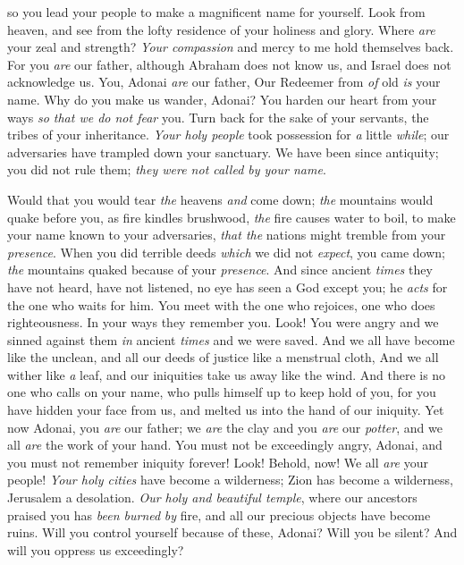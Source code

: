 \begin{biblechapter}
so you lead your people to make a magnificent name for yourself.
 Look from heaven, 
and see from the lofty residence of your holiness and glory. 
Where \textit{are} your zeal and strength? 
\textit{Your compassion} and mercy to me hold themselves back.
\verse For you \textit{are} our father, although Abraham does not know us, 
and Israel does not acknowledge us. 
You, Adonai \textit{are} our father, 
Our Redeemer from \textit{of} old \textit{is} your name.
\verse Why do you make us wander, Adonai? 
You harden our heart from your ways \textit{so that we do not fear} you. 
Turn back for the sake of your servants, 
the tribes of your inheritance.
\verse \textit{Your holy people} took possession for \textit{a} little \textit{while}; 
our adversaries have trampled down your sanctuary.
\verse We have been since antiquity; you did not rule them; 
\textit{they were not called by your name}.
\end{biblechapter}

\begin{biblechapter} %
\verse  Would that you would tear \textit{the} heavens \textit{and} come down; 
\textit{the} mountains would quake before you,
\verse  as fire kindles brushwood, 
\textit{the} fire causes water to boil, 
to make your name known to your adversaries, 
\textit{that the} nations might tremble from your \textit{presence}.
\verse When you did terrible deeds \textit{which} we did not \textit{expect}, you came down; 
\textit{the} mountains quaked because of your \textit{presence}.
\verse And since ancient \textit{times} they have not heard, 
have not listened, 
no eye has seen a God except you; 
he \textit{acts} for the one who waits for him.
\verse You meet with the one who rejoices, 
one who does righteousness. 
In your ways they remember you. 
Look! You were angry and we sinned against them \textit{in} ancient \textit{times} and we were saved.
\verse And we all have become like the unclean, 
and all our deeds of justice like a menstrual cloth, 
And we all wither like \textit{a} leaf, 
and our iniquities take us away like the wind.
\verse And there is no one who calls on your name, 
who pulls himself up to keep hold of you, 
for you have hidden your face from us, 
and melted us into the hand of our iniquity.
\verse Yet now Adonai, you \textit{are} our father; 
we \textit{are} the clay and you \textit{are} our \textit{potter}, 
and we all \textit{are} the work of your hand.
\verse You must not be exceedingly angry, Adonai, 
and you must not remember iniquity forever! Look! Behold, now! We all \textit{are} your people!
\verse \textit{Your holy cities} have become a wilderness; 
Zion has become a wilderness, Jerusalem a desolation.
\verse \textit{Our holy and beautiful temple}, where our ancestors praised you has \textit{been burned} \textit{by} fire, 
and all our precious objects have become ruins.
\verse Will you control yourself because of these, Adonai? 
Will you be silent? 
And will you oppress us exceedingly?
\end{biblechapter}


